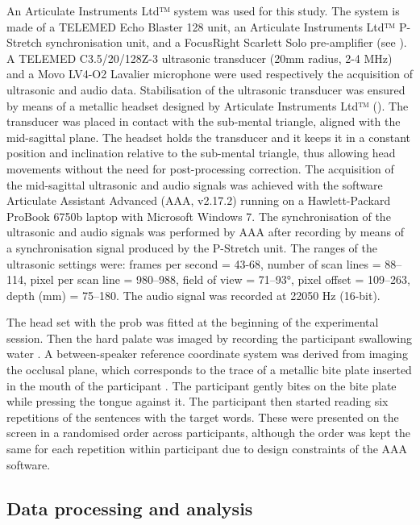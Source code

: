 \documentclass[]{JASAnew}
\begin{document}
\label{s:equipment}

An Articulate Instruments Ltd™ system was used for this study. The
system is made of a TELEMED Echo Blaster 128 unit, an Articulate
Instruments Ltd™ P-Stretch synchronisation unit, and a FocusRight
Scarlett Solo pre-amplifier (see ). A TELEMED
C3.5/20/128Z-3 ultrasonic transducer (20mm radius, 2-4 MHz) and a Movo
LV4-O2 Lavalier microphone were used respectively the acquisition of
ultrasonic and audio data. Stabilisation of the ultrasonic transducer
was ensured by means of a metallic headset designed by Articulate
Instruments Ltd™ (\citeyear{articulate2008}). The transducer was placed
in contact with the sub-mental triangle, aligned with the mid-sagittal
plane. The headset holds the transducer and it keeps it in a constant
position and inclination relative to the sub-mental triangle, thus
allowing head movements without the need for post-processing correction.
The acquisition of the mid-sagittal ultrasonic and audio signals was
achieved with the software Articulate Assistant Advanced (AAA, v2.17.2)
running on a Hawlett-Packard ProBook 6750b laptop with Microsoft Windows
7. The synchronisation of the ultrasonic and audio signals was performed
by AAA after recording by means of a synchronisation signal produced by
the P-Stretch unit. The ranges of the ultrasonic settings were: frames
per second = 43-68, number of scan lines = 88--114, pixel per scan line
= 980--988, field of view = 71--93°, pixel offset = 109--263, depth (mm)
= 75--180. The audio signal was recorded at 22050 Hz (16-bit).

The head set with the prob was fitted at the beginning of the
experimental session. Then the hard palate was imaged by recording the
participant swallowing water \citep{epstein2005}. A between-speaker
reference coordinate system was derived from imaging the occlusal plane,
which corresponds to the trace of a metallic bite plate inserted in the
mouth of the participant \citep{scobbie2011}. The participant gently
bites on the bite plate while pressing the tongue against it. The
participant then started reading six repetitions of the sentences with
the target words. These were presented on the screen in a randomised
order across participants, although the order was kept the same for each
repetition within participant due to design constraints of the AAA
software.

\hypertarget{data-processing-and-analysis}{%
\subsection{Data processing and
analysis}\label{data-processing-and-analysis}}
\end{document}
